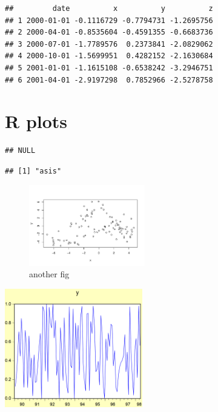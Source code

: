\documentclass[
]{article}
\begin{document}
\begin{verbatim}
##         date          x          y          z
## 1 2000-01-01 -0.1116729 -0.7794731 -1.2695756
## 2 2000-04-01 -0.8535604 -0.4591355 -0.6683736
## 3 2000-07-01 -1.7789576  0.2373841 -2.0829062
## 4 2000-10-01 -1.5699951  0.4282152 -2.1630684
## 5 2001-01-01 -1.1615108 -0.6538242 -3.2946751
## 6 2001-04-01 -2.9197298  0.7852966 -2.5278758
\end{verbatim}

\hypertarget{r-plots}{%
\section{R plots}\label{r-plots}}

\begin{verbatim}
## NULL
\end{verbatim}

\begin{verbatim}
## [1] "asis"
\end{verbatim}

\begin{figure}[h]

{\centering \includegraphics[width=0.45\textwidth]{test_engEviews_files/figure-latex/labe-1} 

}

\caption{another fig}\label{fig:labe}
\end{figure}

\begin{center}\includegraphics[width=0.45\textwidth]{test_engEviews_files/figure-latex//eview-graph-y} \end{center}
\end{document}
